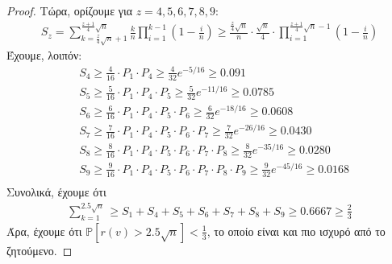 \documentclass[a4paper, oneside, 11pt]{article}
\theoremstyle{definition}
\newcommand{\pr}{\mathbb{P}}
\begin{document}
\begin{enumerate}
\begin{proof}
Τώρα, ορίζουμε για $z=4,5,6,7,8,9$:
      \begin{align*}
	S_z = \sum_{k=\frac{z}{4}\sqrt{n} + 1}^{\frac{z+1}{4} \sqrt{n}} \frac{k}{n} \prod_{i=1}^{k-1} (1 - \frac{i}{n}) \geq \frac{\frac{z}{4}\sqrt{n}}{n} \cdot \frac{\sqrt{n}}{4} \cdot 
	\prod_{i=1}^{\frac{z+1}{4} \sqrt{n} - 1} (1 - \frac{i}{n})
      \end{align*}
Έχουμε, λοιπόν:
      \begin{align*}
	&S_4 \geq \frac{4}{16} \cdot P_1 \cdot P_4 \geq \frac{4}{32} e^{-5/16} \geq 0.091\\
	&S_5 \geq \frac{5}{16} \cdot P_1 \cdot P_4 \cdot P_5 \geq \frac{5}{32} e^{-11/16} \geq 0.0785\\
	&S_6 \geq \frac{6}{16} \cdot P_1 \cdot P_4 \cdot P_5 \cdot P_6 \geq \frac{6}{32} e^{-18/16} \geq 0.0608\\
	&S_7 \geq \frac{7}{16} \cdot P_1 \cdot P_4 \cdot P_5 \cdot P_6 \cdot P_7\geq \frac{7}{32} e^{-26/16} \geq 0.0430\\
	&S_8 \geq \frac{8}{16} \cdot P_1 \cdot P_4 \cdot P_5 \cdot P_6 \cdot P_7 \cdot P_8\geq \frac{8}{32} e^{-35/16} \geq 0.0280\\
	&S_9 \geq \frac{9}{16} \cdot P_1 \cdot P_4 \cdot P_5 \cdot P_6 \cdot P_7 \cdot P_8 \cdot P_9\geq \frac{9}{32} e^{-45/16} \geq 0.0168\\
      \end{align*}
Συνολικά, έχουμε ότι
      \begin{align*}
	\sum_{k=1}^{2.5\sqrt{n}} \geq S_1 + S_4 + S_5 + S_6 + S_7 + S_8 + S_9\geq 0.6667 \geq \frac{2}{3}
      \end{align*}
Άρα, έχουμε ότι $\pr[r(v) > 2.5\sqrt{n}] < \frac{1}{3}$, το οποίο είναι και πιο ισχυρό από το ζητούμενο.



\end{proof}
\end{enumerate}
\end{document}
